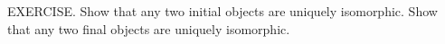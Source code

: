 EXERCISE. Show that any two initial objects are uniquely isomorphic. Show that any two final objects are uniquely isomorphic.
